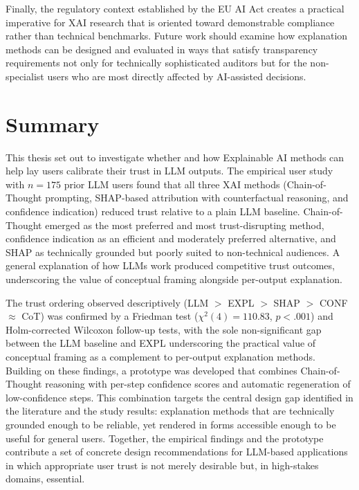 Finally, the regulatory context established by the EU AI Act creates a practical imperative for XAI research that is oriented toward demonstrable compliance rather than technical benchmarks. Future work should examine how explanation methods can be designed and evaluated in ways that satisfy transparency requirements not only for technically sophisticated auditors but for the non-specialist users who are most directly affected by AI-assisted decisions.

\section{Summary}

This thesis set out to investigate whether and how Explainable AI methods can help lay users calibrate their trust in LLM outputs. The empirical user study with $n = 175$ prior LLM users found that all three XAI methods (Chain-of-Thought prompting, SHAP-based attribution with counterfactual reasoning, and confidence indication) reduced trust relative to a plain LLM baseline. Chain-of-Thought emerged as the most preferred and most trust-disrupting method, confidence indication as an efficient and moderately preferred alternative, and SHAP as technically grounded but poorly suited to non-technical audiences. A general explanation of how LLMs work produced competitive trust outcomes, underscoring the value of conceptual framing alongside per-output explanation.

The trust ordering observed descriptively (LLM $>$ EXPL $>$ SHAP $>$ CONF
$\approx$ CoT) was confirmed by a Friedman test ($\chi^2(4) = 110.83$, $p < .001$)
and Holm-corrected Wilcoxon follow-up tests, with the sole non-significant gap between
the LLM baseline and EXPL underscoring the practical value of conceptual framing as a
complement to per-output explanation methods. Building on these findings, a prototype was
developed that combines Chain-of-Thought reasoning with per-step confidence scores and
automatic regeneration of low-confidence steps. This combination targets the central design
gap identified in the literature and the study results: explanation methods that are
technically grounded enough to be reliable, yet rendered in forms accessible enough to be
useful for general users. Together, the empirical findings and the prototype contribute a
set of concrete design recommendations for LLM-based applications in which appropriate
user trust is not merely desirable but, in high-stakes domains, essential.
